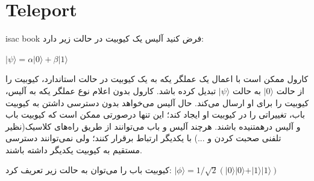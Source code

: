\documentclass{book}
\begin{document}
\section{Teleport}
isac book
فرض کنید آلیس یک کیوبیت در حالت زیر دارد:
\begin{center}
$\vert \psi \rangle = \alpha\vert 0 \rangle + \beta\vert 1 \rangle $\\	
\end{center}

	کارول ممکن است با اعمال یک عملگر یکه‌ به یک کیوبیت در حالت استاندارد، کیوبیت را از حالت $\vert0\rangle$ به حالت $\vert\psi\rangle$  تبدیل کرده باشد. کارول بدون اعلام نوع عملگر یکه به آلیس،‌ کیوبیت را برای او ارسال می‌کند. 
	حال آلیس می‌خواهد بدون دسترسی داشتن به کیوبیت باب، تغییراتی را در کیوبیت او ایجاد کند؛ این تنها درصورتی ممکن است که کیوبیت باب و آلیس درهمتنیده باشند. هرچند آلیس و باب می‌توانند از طریق راه‌های کلاسیک(نظیر تلفنی صحبت کردن و ...) با یکدیگر ارتباط برقرار کنند؛ ولی نمی‌توانند دسترسی مستقیم به کیوبیت یکدیگر داشته باشند. 
	
	کیوبیت باب را می‌توان به حالت زیر تعریف کرد:
$\vert\phi\rangle = 1/\sqrt{2}(\vert0\rangle \vert0\rangle + \vert1\rangle\vert1\rangle)$ 
	
\end{document}
